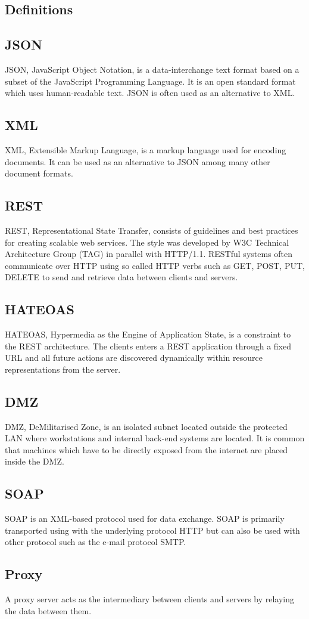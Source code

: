 \documentclass{cslthse-msc}
\begin{document}
\begin{appendices}
\chapter{Definitions}
\section{JSON}
JSON, JavaScript Object Notation, is a data-interchange text format based on a subset of the JavaScript Programming Language. It is an open standard format which uses human-readable text. JSON is often used as an alternative to XML.

\section{XML}
XML, Extensible Markup Language, is a markup language used for encoding documents. It can be used as an alternative to JSON among many other document formats.

\section{REST}
REST, Representational State Transfer, consists of guidelines and best practices for creating scalable web services. The style was developed by W3C Technical Architecture Group (TAG) in parallel with HTTP/1.1. RESTful systems often communicate over HTTP using so called HTTP verbs such as GET, POST, PUT, DELETE to send and retrieve data between clients and servers.

\section{HATEOAS}
HATEOAS, Hypermedia as the Engine of Application State, is a constraint to the REST architecture. The clients enters a REST application through a fixed URL and all future actions are discovered dynamically within resource representations from the server.

\section{DMZ}
DMZ, DeMilitarised  Zone, is an isolated subnet located outside the protected LAN where workstations and internal back-end systems are located. It is common that machines which have to be directly exposed from the internet are placed inside the DMZ.

\section{SOAP}
SOAP is an XML-based protocol used for data exchange. SOAP is primarily transported using with the underlying protocol HTTP but can also be used with other protocol such as the e-mail protocol SMTP.

\section{Proxy}
A proxy server acts as the intermediary between clients and servers by relaying the data between them.

\end{appendices}

\end{document}
